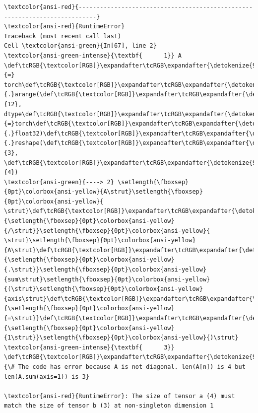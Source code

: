 \documentclass[11pt]{article}
\begin{document}
    \begin{Verbatim}[commandchars=\\\{\}, frame=single, framerule=2mm, rulecolor=\color{outerrorbackground}]
\textcolor{ansi-red}{---------------------------------------------------------------------------}
\textcolor{ansi-red}{RuntimeError}                              Traceback (most recent call last)
Cell \textcolor{ansi-green}{In[67], line 2}
\textcolor{ansi-green-intense}{\textbf{      1}} A \def\tcRGB{\textcolor[RGB]}\expandafter\tcRGB\expandafter{\detokenize{98,98,98}}{=} torch\def\tcRGB{\textcolor[RGB]}\expandafter\tcRGB\expandafter{\detokenize{98,98,98}}{.}arange(\def\tcRGB{\textcolor[RGB]}\expandafter\tcRGB\expandafter{\detokenize{98,98,98}}{12}, dtype\def\tcRGB{\textcolor[RGB]}\expandafter\tcRGB\expandafter{\detokenize{98,98,98}}{=}torch\def\tcRGB{\textcolor[RGB]}\expandafter\tcRGB\expandafter{\detokenize{98,98,98}}{.}float32)\def\tcRGB{\textcolor[RGB]}\expandafter\tcRGB\expandafter{\detokenize{98,98,98}}{.}reshape(\def\tcRGB{\textcolor[RGB]}\expandafter\tcRGB\expandafter{\detokenize{98,98,98}}{3}, \def\tcRGB{\textcolor[RGB]}\expandafter\tcRGB\expandafter{\detokenize{98,98,98}}{4})
\textcolor{ansi-green}{----> 2} \setlength{\fboxsep}{0pt}\colorbox{ansi-yellow}{A\strut}\setlength{\fboxsep}{0pt}\colorbox{ansi-yellow}{ \strut}\def\tcRGB{\textcolor[RGB]}\expandafter\tcRGB\expandafter{\detokenize{98,98,98}}{\setlength{\fboxsep}{0pt}\colorbox{ansi-yellow}{/\strut}}\setlength{\fboxsep}{0pt}\colorbox{ansi-yellow}{ \strut}\setlength{\fboxsep}{0pt}\colorbox{ansi-yellow}{A\strut}\def\tcRGB{\textcolor[RGB]}\expandafter\tcRGB\expandafter{\detokenize{98,98,98}}{\setlength{\fboxsep}{0pt}\colorbox{ansi-yellow}{.\strut}}\setlength{\fboxsep}{0pt}\colorbox{ansi-yellow}{sum\strut}\setlength{\fboxsep}{0pt}\colorbox{ansi-yellow}{(\strut}\setlength{\fboxsep}{0pt}\colorbox{ansi-yellow}{axis\strut}\def\tcRGB{\textcolor[RGB]}\expandafter\tcRGB\expandafter{\detokenize{98,98,98}}{\setlength{\fboxsep}{0pt}\colorbox{ansi-yellow}{=\strut}}\def\tcRGB{\textcolor[RGB]}\expandafter\tcRGB\expandafter{\detokenize{98,98,98}}{\setlength{\fboxsep}{0pt}\colorbox{ansi-yellow}{1\strut}}\setlength{\fboxsep}{0pt}\colorbox{ansi-yellow}{)\strut}
\textcolor{ansi-green-intense}{\textbf{      3}} \def\tcRGB{\textcolor[RGB]}\expandafter\tcRGB\expandafter{\detokenize{95,135,135}}{\# The code has error because A is not diagonal. len(A[n]) is 4 but len(A.sum(axis=1)) is 3}

\textcolor{ansi-red}{RuntimeError}: The size of tensor a (4) must match the size of tensor b (3) at non-singleton dimension 1
    \end{Verbatim}
\end{document}
